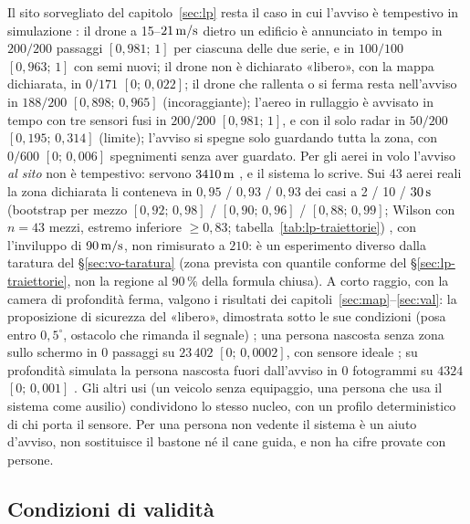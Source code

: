 Il sito sorvegliato del capitolo~\ref{sec:lp} resta il caso in cui l'avviso è tempestivo in simulazione : il drone a 15--$21\,\mathrm{m/s}$ dietro un edificio è annunciato in tempo in $200/200$ passaggi $[0{,}981;\,1]$ per ciascuna delle due serie, e in $100/100$ $[0{,}963;\,1]$ con semi nuovi; il drone non è dichiarato «libero», con la mappa dichiarata, in $0/171$ $[0;\,0{,}022]$; il drone che rallenta o si ferma resta nell'avviso in $188/200$ $[0{,}898;\,0{,}965]$ (incoraggiante); l'aereo in rullaggio è avvisato in tempo con tre sensori fusi in $200/200$ $[0{,}981;\,1]$, e con il solo radar in $50/200$ $[0{,}195;\,0{,}314]$ (limite); l'avviso si spegne solo guardando tutta la zona, con $0/600$ $[0;\,0{,}006]$ spegnimenti senza aver guardato. Per gli aerei in volo l'avviso \emph{al sito} non è tempestivo: servono $3410\,\mathrm{m}$ , e il sistema lo scrive. Sui 43 aerei reali la zona dichiarata li conteneva in $0{,}95$ / $0{,}93$ / $0{,}93$ dei casi a 2 / 10 / $30\,\mathrm{s}$ (bootstrap per mezzo $[0{,}92;\,0{,}98]$ / $[0{,}90;\,0{,}96]$ / $[0{,}88;\,0{,}99]$; Wilson con $n=43$ mezzi, estremo inferiore $\ge0{,}83$; tabella~\ref{tab:lp-traiettorie}) , con l'inviluppo di $90\,\mathrm{m/s}$, non rimisurato a $210$: è un esperimento diverso dalla taratura del \S\ref{sec:vo-taratura} (zona prevista con quantile conforme del \S\ref{sec:lp-traiettorie}, non la regione al $90\,\%$ della formula chiusa). A corto raggio, con la camera di profondità ferma, valgono i risultati dei capitoli~\ref{sec:map}--\ref{sec:val}: la proposizione di sicurezza del «libero», dimostrata sotto le sue condizioni (posa entro $0{,}5^\circ$, ostacolo che rimanda il segnale) ; una persona nascosta senza zona sullo schermo in $0$ passaggi su $23\,402$ $[0;\,0{,}0002]$, con sensore ideale ; su profondità simulata la persona nascosta fuori dall'avviso in $0$ fotogrammi su $4324$ $[0;\,0{,}001]$ . Gli altri usi (un veicolo senza equipaggio, una persona che usa il sistema come ausilio) condividono lo stesso nucleo, con un profilo deterministico di chi porta il sensore. Per una persona non vedente il sistema è un aiuto d'avviso, non sostituisce il bastone né il cane guida, e non ha cifre provate con persone.

\subsection{Condizioni di validità}\label{sec:vo-validita}

